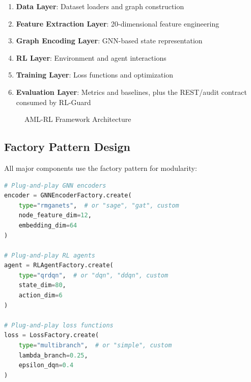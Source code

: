 \documentclass[11pt,a4paper]{article}
\begin{document}
\begin{enumerate}
    \item \textbf{Data Layer}: Dataset loaders and graph construction
    \item \textbf{Feature Extraction Layer}: 20-dimensional feature engineering
    \item \textbf{Graph Encoding Layer}: GNN-based state representation
    \item \textbf{RL Layer}: Environment and agent interactions
    \item \textbf{Training Layer}: Loss functions and optimization
    \item \textbf{Evaluation Layer}: Metrics and baselines, plus the REST/audit contract consumed by RL-Guard
\end{enumerate}

\begin{figure}[htbp]
\centering
{}
\caption{AML-RL Framework Architecture}
\label{fig:architecture}
\end{figure}

\subsection{Factory Pattern Design}

All major components use the factory pattern for modularity:

\begin{lstlisting}[language=Python, caption=Factory Pattern Example]
# Plug-and-play GNN encoders
encoder = GNNEncoderFactory.create(
    type="rmganets",  # or "sage", "gat", custom
    node_feature_dim=12,
    embedding_dim=64
)

# Plug-and-play RL agents
agent = RLAgentFactory.create(
    type="qrdqn",  # or "dqn", "ddqn", custom
    state_dim=80,
    action_dim=6
)

# Plug-and-play loss functions
loss = LossFactory.create(
    type="multibranch",  # or "simple", custom
    lambda_branch=0.25,
    epsilon_dqn=0.4
)
\end{lstlisting}
\end{document}
